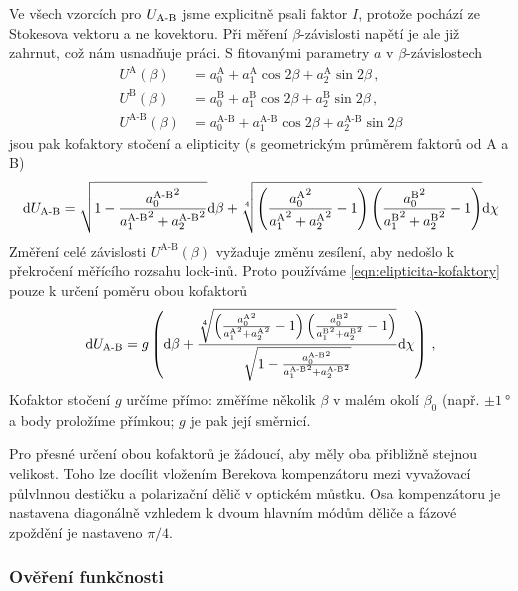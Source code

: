 Ve všech vzorcích pro $U_\textrm{A-B}$ jsme explicitně psali faktor $I$, protože pochází ze Stokesova vektoru a ne kovektoru.
Při měření $\beta$-závislosti napětí je ale již zahrnut, což nám usnadňuje práci.
S fitovanými parametry $a$ v $\beta$-závislostech
\begin{align}
    U^\textrm{A}(\beta) &= a^\textrm{A}_0 + a^\textrm{A}_1 \cos2\beta + a^\textrm{A}_2 \sin2\beta \,,\\
    U^\textrm{B}(\beta) &= a^\textrm{B}_0 + a^\textrm{B}_1 \cos2\beta + a^\textrm{B}_2 \sin2\beta \,,\\
    U^\textrm{A-B}(\beta) &= a^\textrm{A-B}_0 + a^\textrm{A-B}_1 \cos2\beta + a^\textrm{A-B}_2 \sin2\beta
\end{align}
jsou pak kofaktory stočení a elipticity (s geometrickým průměrem faktorů od A a B)
\begin{equation}
\label{eqn:elipticita-kofaktory}
\textrm{d}U_\textrm{A-B} = \sqrt{1-\frac{{a^\textrm{A-B}_0}^2}{{a^\textrm{A-B}_1}^2+{a^\textrm{A-B}_2}^2}}\textrm{d}\beta 
+ \sqrt[4]{\left(\frac{{a^\textrm{A}_0}^2}{{a^\textrm{A}_1}^2+{a^\textrm{A}_2}^2}-1 \right)\left(\frac{{a^\textrm{B}_0}^2}{{a^\textrm{B}_1}^2+{a^\textrm{B}_2}^2}-1 \right)}\textrm{d}\chi
\end{equation}
Změření celé závislosti $U^\textrm{A-B}(\beta)$ vyžaduje změnu zesílení, aby nedošlo k překročení měřícího rozsahu lock-inů.
Proto používáme \eqref{eqn:elipticita-kofaktory} pouze k určení poměru obou kofaktorů
\begin{equation}
    \textrm{d}U_\textrm{A-B} = g \left( \textrm{d}\beta + \frac{\sqrt[4]{\left(\frac{{a^\textrm{A}_0}^2}{{a^\textrm{A}_1}^2+{a^\textrm{A}_2}^2}-1 \right)\left(\frac{{a^\textrm{B}_0}^2}{{a^\textrm{B}_1}^2+{a^\textrm{B}_2}^2}-1 \right)}}{\sqrt{1-\frac{{a^\textrm{A-B}_0}^2}{{a^\textrm{A-B}_1}^2+{a^\textrm{A-B}_2}^2}}}\textrm{d}\chi \right) \,,
\end{equation}
Kofaktor stočení $g$ určíme přímo: změříme několik $\beta$ v malém okolí $\beta_0$ (např. $\pm\SI{1}{\degree}$ a body proložíme přímkou; $g$ je pak její směrnicí.

Pro přesné určení obou kofaktorů je žádoucí, aby měly oba přibližně stejnou velikost.
Toho lze docílit vložením Berekova kompenzátoru mezi vyvažovací půlvlnnou destičku a polarizační dělič v optickém můstku.
Osa kompenzátoru je nastavena diagonálně vzhledem k dvoum hlavním módům děliče a fázové zpoždění je nastaveno $\pi/4$.




\subsubsection*{Ověření funkčnosti}


